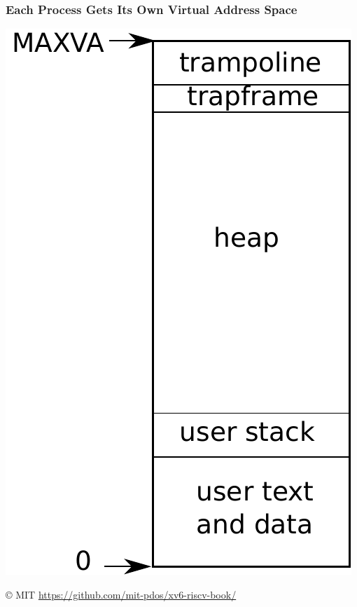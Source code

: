  \begin{frame}
    \frametitle{Each Process Gets Its Own Virtual Address Space}

    \begin{center}
      \includegraphics[scale=0.4]{as.pdf}
    \end{center}

    © MIT \url{https://github.com/mit-pdos/xv6-riscv-book/}
  \end{frame}

